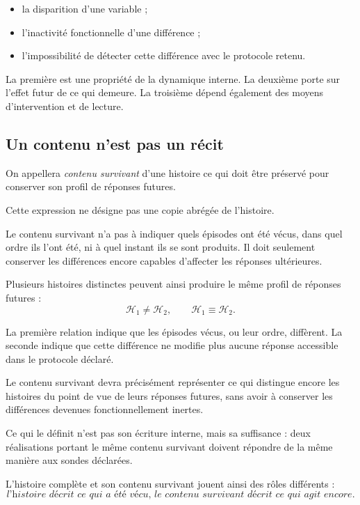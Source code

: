 \begin{itemize}
\tightlist
\item
  la disparition d'une variable ;
\item
  l'inactivité fonctionnelle d'une différence ;
\item
  l'impossibilité de détecter cette différence avec le protocole retenu.
\end{itemize}

La première est une propriété de la dynamique interne. La deuxième porte sur l'effet futur de ce qui demeure. La troisième dépend également des moyens d'intervention et de lecture.

\subsection{Un contenu n'est pas un récit}

On appellera \emph{contenu survivant} d'une histoire ce qui doit être préservé pour conserver son profil de réponses futures.

Cette expression ne désigne pas une copie abrégée de l'histoire.

Le contenu survivant n'a pas à indiquer quels épisodes ont été vécus, dans quel ordre ils l'ont été, ni à quel instant ils se sont produits. Il doit seulement conserver les différences encore capables d'affecter les réponses ultérieures.

Plusieurs histoires distinctes peuvent ainsi produire le même profil de réponses futures :
\[
\mathcal H_1\neq\mathcal H_2,
\qquad
\mathcal H_1\equiv\mathcal H_2.
\]

La première relation indique que les épisodes vécus, ou leur ordre, diffèrent. La seconde indique que cette différence ne modifie plus aucune réponse accessible dans le protocole déclaré.

Le contenu survivant devra précisément représenter ce qui distingue encore les histoires du point de vue de leurs réponses futures, sans avoir à conserver les différences devenues fonctionnellement inertes.

Ce qui le définit n'est pas son écriture interne, mais sa suffisance : deux réalisations portant le même contenu survivant doivent répondre de la même manière aux sondes déclarées.

L'histoire complète et son contenu survivant jouent ainsi des rôles
différents :
\[
\textit{l'histoire décrit ce qui a été vécu, le contenu survivant décrit ce qui agit encore}.
\]

